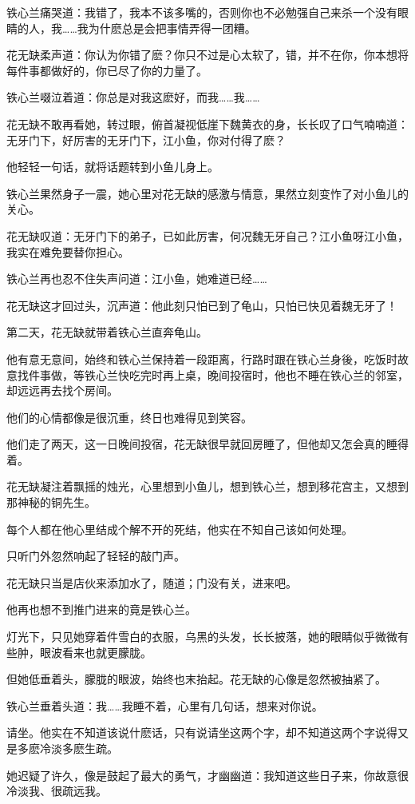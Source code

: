 \documentclass[12pt,oneside]{book}
\begin{document}
铁心兰痛哭道：我错了，我本不该多嘴的，否则你也不必勉强自己来杀一个没有眼睛的人，我\ldots\ldots 我为什麽总是会把事情弄得一团糟。

花无缺柔声道：你认为你错了麽？你只不过是心太软了，错，并不在你，你本想将每件事都做好的，你已尽了你的力量了。

铁心兰啜泣着道：你总是对我这麽好，而我\ldots\ldots 我\ldots\ldots{}

花无缺不敢再看她，转过眼，俯首凝视低崖下魏黄衣的身，长长叹了口气喃喃道：无牙门下，好厉害的无牙门下，江小鱼，你对付得了麽？

他轻轻一句话，就将话题转到小鱼儿身上。

铁心兰果然身子一震，她心里对花无缺的感激与情意，果然立刻变怍了对小鱼儿的关心。

花无缺叹道：无牙门下的弟子，已如此厉害，何况魏无牙自己？江小鱼呀江小鱼，我实在难免要替你担心。

铁心兰再也忍不住失声问道：江小鱼，她难道已经\ldots\ldots{}

花无缺这才回过头，沉声道：他此刻只怕已到了龟山，只怕已快见着魏无牙了！

第二天，花无缺就带着铁心兰直奔龟山。

他有意无意间，始终和铁心兰保持着一段距离，行路时跟在铁心兰身後，吃饭时故意找件事做，等铁心兰快吃完时再上桌，晚间投宿时，他也不睡在铁心兰的邻室，却远远再去找个房间。

他们的心情都像是很沉重，终日也难得见到笑容。

他们走了两天，这一日晚间投宿，花无缺很早就回房睡了，但他却又怎会真的睡得着。

花无缺凝注着飘摇的烛光，心里想到小鱼儿，想到铁心兰，想到移花宫主，又想到那神秘的铜先生。

每个人都在他心里结成个解不开的死结，他实在不知自己该如何处理。

只听门外忽然响起了轻轻的敲门声。

花无缺只当是店伙来添加水了，随道；门没有关，进来吧。

他再也想不到推门进来的竟是铁心兰。

灯光下，只见她穿着件雪白的衣服，乌黑的头发，长长披落，她的眼睛似乎微微有些肿，眼波看来也就更朦胧。

但她低垂着头，朦胧的眼波，始终也末抬起。花无缺的心像是忽然被抽紧了。

铁心兰垂着头道：我\ldots\ldots 我睡不着，心里有几句话，想来对你说。

请坐。他实在不知道该说什麽话，只有说请坐这两个字，却不知道这两个字说得又是多麽冷淡多麽生疏。

她迟疑了许久，像是鼓起了最大的勇气，才幽幽道：我知道这些日子来，你故意很冷淡我、很疏远我。
\end{document}

